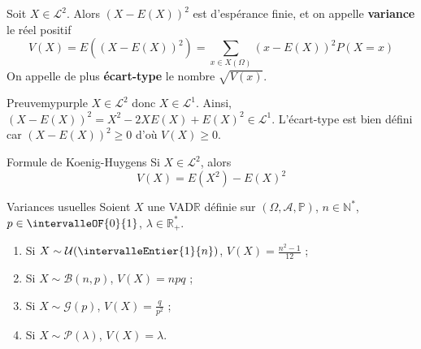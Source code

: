     \begin{defitheo}{}{}
        Soit $X \in \mathcal{L}^2$. Alors $(X - E(X))^2$ est d’espérance finie, et on appelle \textbf{variance} le réel positif 
        \[ V(X) = E((X - E(X))^2) = \sum_{x \in X(\Omega)} (x- E(X))^2 P(X = x) \]   
        On appelle de plus \textbf{écart-type} le nombre $\sqrt{V(x)}$.
    \end{defitheo}

    \begin{demo}{Preuve}{mypurple}
        $ X \in \mathcal{L}^2$ donc $X \in \mathcal{L}^1$. Ainsi, $(X - E(X))^2 = X^2 - 2 X E(X) + E(X)^2 \in \mathcal{L}^1$. L’écart-type est bien défini car $(X- E(X))^2 \geq 0$ d’où $V(X) \geq 0$. 
    \end{demo}

    \begin{prop}{Formule de Koenig-Huygens}{}
        Si $X \in \mathcal{L}^2$, alors 
        \[ V(X) = E(X^2) - E(X)^2 \]   
    \end{prop}

    \begin{theo}{Variances usuelles}{}
        Soient $X$ une VAD$\mathbb{R}$ définie sur $(\Omega, \mathcal{A}, \mathbb{P})$, $n \in \mathbb{N}^*$, $p \in \intervalleOF{0}{1}$, $\lambda \in \mathbb{R}_+^*$.
        \begin{enumerate}
            \item Si $X \sim \mathcal{U}(\intervalleEntier{1}{n})$, $V(X) = \frac{n^2 - 1}{12}$ ;
            \item Si $X \sim \mathcal{B}(n,p)$, $V(X) = npq$ ;
            \item Si $X \sim \mathcal{G}(p)$, $V(X) = \frac{q}{p^2}$ ;
            \item Si $X \sim \mathcal{P}(\lambda)$, $V(X) = \lambda$.
        \end{enumerate} 
    \end{theo}


